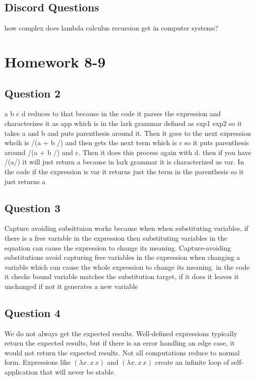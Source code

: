 \documentclass{article}
\theoremstyle{plain}
\theoremstyle{definition}
\theoremstyle{remark}
\begin{document}
\subsection{Discord Questions}

how complex does lambda calculus recursion get in computer systems?


\section{Homework 8-9}\label{homework89}

\subsection{Question 2}

  a b c d reduces to that because in the code it parses the expression and characterizes it as app which is in the lark grammar defined as exp1 exp2 so it takes a and b and puts parenthesis around it. Then it goes to the next expression whcih is /(a + b /) and then gets the next term which is c so it puts parenthesis around /(a + b /) and c. Then it does this process again with d. then if you have /(a/) it will just return a because in lark grammar it is characterized as var. In the code if the expression is var it returns just the term in the parenthesis so it just returns a

\subsection{Question 3}

Capture avoiding subsittuion works because when when substituting variables, if there is a free variable in the expression then substituting variables in the equation can cause the expression to change its meaning. Capture-avoiding substitutions avoid capturing free variables in the expression when changing a variable which can cause the whole expression to change its meaning. in the code it checks bound variable matches the substitution target, if it does it leaves it unchanged if not it generates a new variable

\subsection{Question 4}

We do not always get the expected results. Well-defined expressions typically return the expected results, but if there is an error handling an edge case, it would not return the expected results. Not all computations reduce to normal form. Expressions like \((\lambda x. \, x \, x)\) and \((\lambda x. \, x \, x)\) create an infinite loop of self-application that will never be stable.
\end{document}
